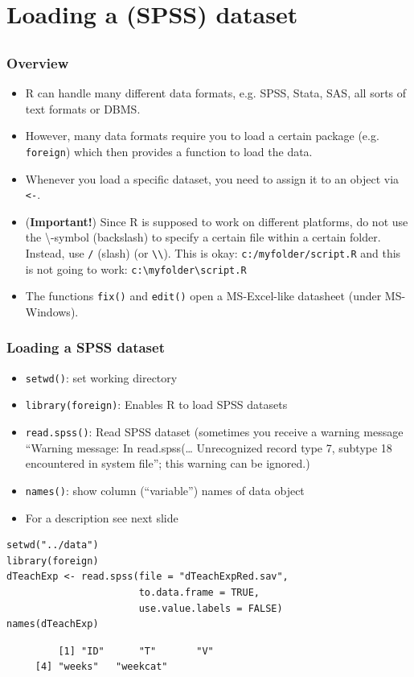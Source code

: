 \documentclass[bigger]{beamer}
\providecommand{\alert}[1]{\textbf{#1}}
\begin{document}
\section{Loading a (SPSS) dataset}
\label{sec-3}
\subsection{}
\begin{frame}
\frametitle{Overview}
\label{sec-3-1-1}

\begin{itemize}
\item R can handle many different data formats, e.g. SPSS, Stata, SAS, all sorts of text formats or DBMS.
\item However, many data formats require you to load a certain package (e.g. \texttt{foreign}) which then provides a function to load the data.
\item Whenever you load a specific dataset, you need to assign it to an object via \texttt{<-}.
\item (\alert{Important!}) Since R is supposed to work on different platforms, do not use the
      \textbackslash-symbol (backslash) to specify a certain file within a certain
      folder. Instead, use \texttt{/} (slash) (or \texttt{\textbackslash{}\textbackslash{}}). This is okay:
      \texttt{c:/myfolder/script.R} and this is not going to work: \texttt{c:\textbackslash{}myfolder\textbackslash{}script.R}
\item The functions \texttt{fix()} and \texttt{edit()} open a MS-Excel-like datasheet (under MS-Windows).
\end{itemize}
\end{frame}
\begin{frame}[fragile,shrink = 15]
\frametitle{Loading a SPSS dataset}
\label{sec-3-1-2}

\begin{itemize}
\item \texttt{setwd()}: set working directory
\item \texttt{library(foreign)}: Enables R to load SPSS datasets
\item \texttt{read.spss()}: Read SPSS dataset (sometimes you receive a warning message
      \enquote{Warning message: In read.spss(\ldots{} Unrecognized record type 7, subtype 18
      encountered in system file}; this warning can be ignored.)
\item \texttt{names()}: show column (\enquote{variable}) names of data object
\item For a description see next slide
\end{itemize}


\lstset{language=R}
\begin{lstlisting}
setwd("../data")
library(foreign)
dTeachExp <- read.spss(file = "dTeachExpRed.sav", 
                       to.data.frame = TRUE, 
                       use.value.labels = FALSE)
names(dTeachExp)
\end{lstlisting}

\begin{verbatim}
         [1] "ID"      "T"       "V"      
     [4] "weeks"   "weekcat"
\end{verbatim}
\end{frame}
\end{document}

